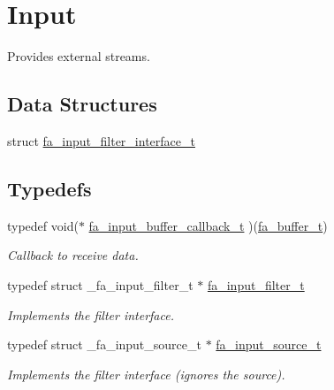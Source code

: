 \hypertarget{group___fa_input}{\section{Input}
\label{group___fa_input}
}


Provides external streams.  


\subsection*{Data Structures}
\begin{DoxyCompactItemize}
\item 
struct \hyperlink{structfa__input__filter__interface__t}{fa\-\_\-input\-\_\-filter\-\_\-interface\-\_\-t}
\end{DoxyCompactItemize}
\subsection*{Typedefs}
\begin{DoxyCompactItemize}
\item 
typedef void($\ast$ \hyperlink{group___fa_input_gac28594faa4f5b9d2815a4dda56634282}{fa\-\_\-input\-\_\-buffer\-\_\-callback\-\_\-t} )(\hyperlink{group___fa_buffer_ga0ed7a1d783ab322e2e8be02432d0839e}{fa\-\_\-buffer\-\_\-t})
\begin{DoxyCompactList}\small\item\em Callback to receive data. \end{DoxyCompactList}\item 
typedef struct \-\_\-fa\-\_\-input\-\_\-filter\-\_\-t $\ast$ \hyperlink{group___fa_input_ga9d81ca05f2cd813a8f8b91d3a8b59c33}{fa\-\_\-input\-\_\-filter\-\_\-t}
\begin{DoxyCompactList}\small\item\em Implements the filter interface. \end{DoxyCompactList}\item 
typedef struct \-\_\-fa\-\_\-input\-\_\-source\-\_\-t $\ast$ \hyperlink{group___fa_input_gad1696c209650d2d4758d2af9edefb919}{fa\-\_\-input\-\_\-source\-\_\-t}
\begin{DoxyCompactList}\small\item\em Implements the filter interface (ignores the source). \end{DoxyCompactList}\end{DoxyCompactItemize}
